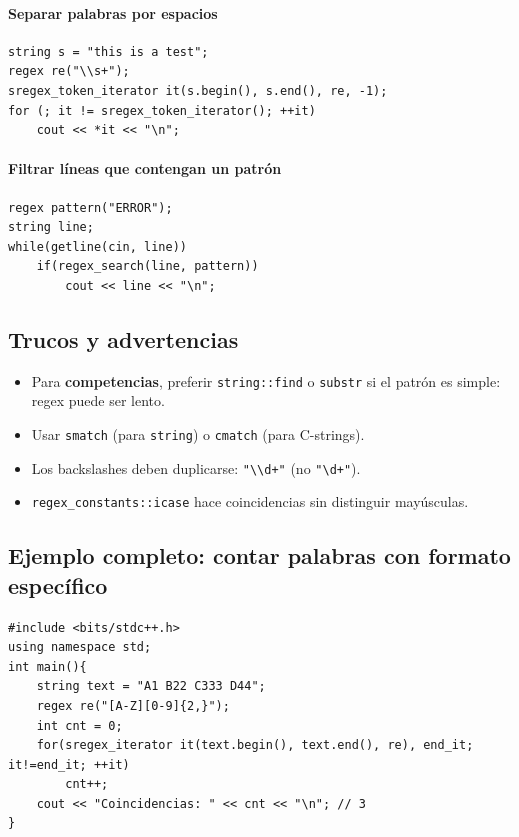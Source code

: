 \documentclass{article}
\begin{document}
\paragraph{Separar palabras por espacios}
\begin{lstlisting}[style=cppstyle]
string s = "this is a test";
regex re("\\s+");
sregex_token_iterator it(s.begin(), s.end(), re, -1);
for (; it != sregex_token_iterator(); ++it)
    cout << *it << "\n";
\end{lstlisting}

\paragraph{Filtrar líneas que contengan un patrón}
\begin{lstlisting}[style=cppstyle]
regex pattern("ERROR");
string line;
while(getline(cin, line))
    if(regex_search(line, pattern))
        cout << line << "\n";
\end{lstlisting}

\subsection{Trucos y advertencias}

\begin{itemize}
  \item Para \textbf{competencias}, preferir \lstinline|string::find| o \lstinline|substr| si el patrón es simple: regex puede ser lento.
  \item Usar \lstinline|smatch| (para \lstinline|string|) o \lstinline|cmatch| (para C-strings).
  \item Los backslashes deben duplicarse: \lstinline|"\\d+"| (no \lstinline|"\d+"|).
  \item \lstinline|regex_constants::icase| hace coincidencias sin distinguir mayúsculas.
\end{itemize}

\subsection{Ejemplo completo: contar palabras con formato específico}
\begin{lstlisting}[style=cppstyle]
#include <bits/stdc++.h>
using namespace std;
int main(){
    string text = "A1 B22 C333 D44";
    regex re("[A-Z][0-9]{2,}");
    int cnt = 0;
    for(sregex_iterator it(text.begin(), text.end(), re), end_it; it!=end_it; ++it)
        cnt++;
    cout << "Coincidencias: " << cnt << "\n"; // 3
}
\end{lstlisting}
\end{document}
